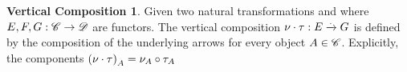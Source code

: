 \theoremstyle{definition}\newtheorem*{verticalcompositiondef}{Vertical Composition}

\begin{verticalcompositiondef}
    Given two natural transformations
     and
     where $\mathnormal{E, F, G}: \mathscr{C} \to
    \mathscr{D}$ are functors. The vertical composition \cite{RelationalAlgebraByWayOfAdjunctions}
    $\nu \cdot \tau: \mathnormal{E} \xrightarrow{.} \mathnormal{G}$
    is defined by the composition of the underlying arrows for every
    object $\mathnormal{A} \in \mathscr{C}$. Explicitly, the components
    $\left(\nu \cdot \tau\right)_{A} =
    \mathnormal{\nu_{A}} \circ \mathnormal{\tau_{A}}$
\label{sec:verticalcomposition}
\end{verticalcompositiondef}


